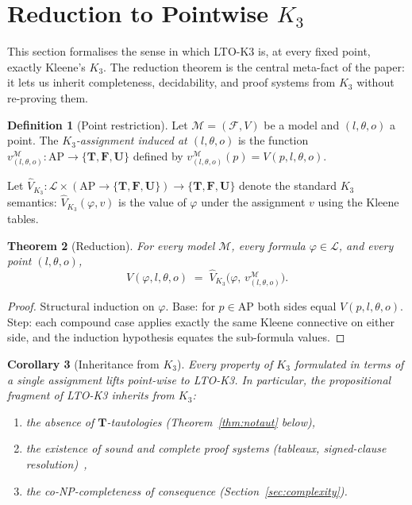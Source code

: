\documentclass[11pt,a4paper]{article}
\theoremstyle{definition}
\newtheorem{definition}{Definition}
\theoremstyle{plain}
\newtheorem{theorem}[definition]{Theorem}
\newtheorem{corollary}[definition]{Corollary}
\theoremstyle{remark}
\newcommand{\Tv}{\mathbf{T}}
\newcommand{\Fv}{\mathbf{F}}
\newcommand{\Uv}{\mathbf{U}}
\newcommand{\Vals}{\{\Tv, \Fv, \Uv\}}
\newcommand{\Vh}{\widehat{V}}
\newcommand{\frm}{(l, \theta, o)}
\newcommand{\Lang}{\mathcal{L}}
\newcommand{\AP}{\mathrm{AP}}
\newcommand{\Mod}{\mathcal{M}}
\newcommand{\Frame}{\mathcal{F}}
\begin{document}
\section{Reduction to Pointwise $K_3$}
\label{sec:reduction}

This section formalises the sense in which LTO-K3 is, at every fixed
point, exactly Kleene's $K_3$. The reduction theorem is the central
meta-fact of the paper: it lets us inherit completeness, decidability, and
proof systems from $K_3$ without re-proving them.

\begin{definition}[Point restriction]
Let $\Mod = (\Frame, V)$ be a model and $\frm$ a point. The
\emph{$K_3$-assignment induced at $\frm$} is the function
$v_{\frm}^{\Mod} : \AP \to \Vals$ defined by
$v_{\frm}^{\Mod}(p) = V(p, l, \theta, o)$.
\end{definition}

Let $\Vh_{K_3} : \Lang \times (\AP \to \Vals) \to \Vals$ denote the
standard $K_3$ semantics: $\Vh_{K_3}(\varphi, v)$ is the value of
$\varphi$ under the assignment $v$ using the Kleene tables.

\begin{theorem}[Reduction]
\label{thm:reduction}
For every model $\Mod$, every formula $\varphi \in \Lang$, and every point
$\frm$,
\[
\Vh(\varphi, l, \theta, o) \;=\; \Vh_{K_3}\bigl(\varphi,\, v_{\frm}^{\Mod}\bigr).
\]
\end{theorem}

\begin{proof}
Structural induction on $\varphi$. Base: for $p \in \AP$ both sides equal
$V(p, l, \theta, o)$. Step: each compound case applies exactly the same
Kleene connective on either side, and the induction hypothesis equates
the sub-formula values. \qedhere
\end{proof}

\begin{corollary}[Inheritance from $K_3$]
\label{cor:inherit}
Every property of $K_3$ formulated in terms of a single assignment lifts
point-wise to LTO-K3. In particular, the propositional fragment of LTO-K3
inherits from $K_3$:
\begin{enumerate}
  \item the absence of $\Tv$-tautologies (Theorem~\ref{thm:notaut} below),
  \item the existence of sound and complete proof systems
  (tableaux, signed-clause resolution)~\cite{hahnle1993},
  \item the co-NP-completeness of consequence (Section~\ref{sec:complexity}).
\end{enumerate}
\end{corollary}
\end{document}
